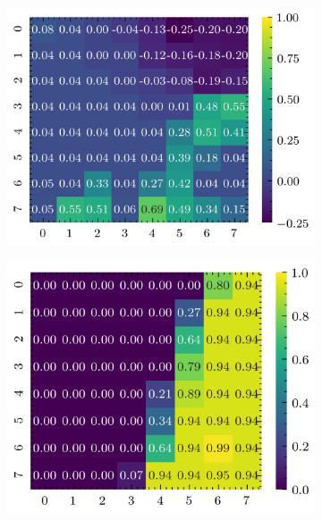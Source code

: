 \documentclass[../document.tex]{subfiles}
\begin{document}
\begin{figure}[H]
\begin{subfigure}[b]{0.19\textwidth}
        \includegraphics[width=\linewidth]{../img/5/quarry/worst/heatmap-2d-2.png}
    \end{subfigure}
    \begin{subfigure}[b]{0.19\textwidth}
        \includegraphics[width=\linewidth]{../img/5/quarry/worst/heatmap-2d-3.png}
    \end{subfigure}  
    \begin{subfigure}[b]{0.19\textwidth}

\end{subfigure}
\end{figure}
\end{document}
